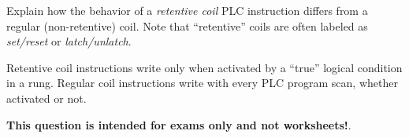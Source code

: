 

Explain how the behavior of a {\it retentive coil} PLC instruction differs from a regular (non-retentive) coil.  Note that ``retentive'' coils are often labeled as {\it set/reset} or {\it latch/unlatch}.







Retentive coil instructions write only when activated by a ``true'' logical condition in a rung.  Regular coil instructions write with every PLC program scan, whether activated or not.







{\bf This question is intended for exams only and not worksheets!}.


